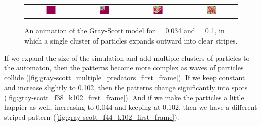 \begin{figure}[h]
\centering
\mySfFamily
\begin{tabular}{c c c c}
\includegraphics[width = 0.19\textwidth]{../images_CMYK/gs_f038_k100_Moment_1} & \includegraphics[width = 0.19\textwidth]{../images_CMYK/gs_f038_k100_Moment_2} & \includegraphics[width = 0.19\textwidth]{../images_CMYK/gs_f038_k100_Moment_3} & \includegraphics[width = 0.19\textwidth]{../images_CMYK/gs_f038_k100_Moment_4}
\end{tabular}
\caption{An animation of the Gray-Scott model for  = 0.034 and  = 0.1, in which a single cluster of  particles expands outward into clear stripes.}
\label{fig:gray-scott_movie_first_frame}
\end{figure}

If we expand the size of the simulation and add multiple clusters of  particles to the automaton, then the patterns become more complex as waves of  particles collide (\autoref{fig:gray-scott_multiple_predators_first_frame}). If we keep  constant and increase  slightly to 0.102, then the patterns change significantly into spots (\autoref{fig:gray-scott_f38_k102_first_frame}). And if we make the  particles a little happier as well, increasing   to 0.044 and keeping  at 0.102, then we have a different striped pattern (\autoref{fig:gray-scott_f44_k102_first_frame}).\\

